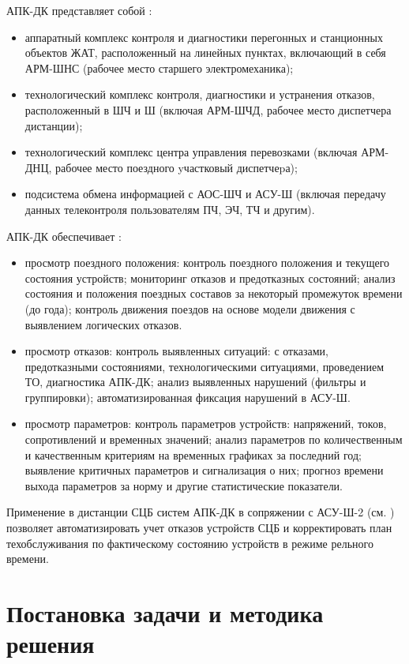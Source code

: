 АПК-ДК представляет собой \cite{prishepa}:
\begin{itemize}
	\item аппаратный комплекс контроля и диагностики перегонных и станционных объектов ЖАТ, расположенный на линейных пунктах, включающий в себя АРМ-ШНС (рабочее место старшего электромеханика);
	\item технологический комплекс контроля, диагностики и устранения отказов, расположенный в ШЧ и Ш (включая АРМ-ШЧД, рабочее место диспетчера дистанции);
	\item технологический комплекс центра управления перевозками (включая АРМ-ДНЦ, рабочее место поездного yчастковый диспетчеpа);
	\item подсистема обмена информацией с АОС-ШЧ и АСУ-Ш (включая передачу данных телеконтроля пользователям ПЧ, ЭЧ, ТЧ и другим).
\end{itemize}
АПК-ДК обеспечивает \cite{apk-dk-nesterov}:
\begin{itemize}
	\item просмотр поездного положения:
	\subitem контроль поездного положения и текущего состояния устройств;
	\subitem мониторинг отказов и предотказных состояний;
	\subitem анализ состояния и положения поездных составов за некоторый промежуток времени (до года);
	\subitem контроль движения поездов на основе модели движения с выявлением логических отказов.
	\item просмотр отказов:
	\subitem контроль выявленных ситуаций: с отказами, предотказными состояниями, технологическими ситуациями, проведением ТО, диагностика АПК-ДК;
	\subitem анализ выявленных нарушений (фильтры и группировки);
	\subitem автоматизированная фиксация нарушений в АСУ-Ш.
	\item просмотр параметров:
	\subitem контроль параметров устройств: напряжений, токов, сопротивлений и временных значений;
	\subitem анализ параметров по количественным и качественным критериям на временных графиках за последний год;
	\subitem выявление критичных параметров и сигнализация о них;
	\subitem прогноз времени выхода параметров за норму и другие статистические показатели.
\end{itemize}

Применение в дистанции СЦБ систем АПК-ДК в сопряжении с АСУ-Ш-2 (см. \cite{asu-sh-2}) позволяет автоматизировать учет отказов устройств СЦБ и корректировать план техобслуживания по фактическому состоянию устройств в режиме рельного времени.

\section{Постановка задачи и методика решения}
